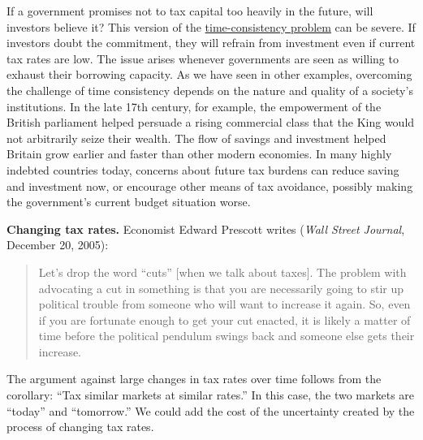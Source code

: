 If a government promises not to tax capital too heavily in the future,
will investors believe it?
This version of the \hyperref[sec:time_cons]{time-consistency problem} can be severe. If investors doubt the commitment, they
will refrain from investment even if current tax rates are low. The issue arises
whenever governments are seen as willing to exhaust their borrowing capacity.
As we have seen in other examples, overcoming the challenge of time
consistency depends on the nature and quality of a society's
institutions. In the late 17th century, for example,
the empowerment of the British parliament helped persuade a
rising commercial class that the King would not arbitrarily
seize their wealth. The flow of savings and investment helped Britain
grow earlier and faster than other modern economies.
In many highly indebted countries today,
concerns about future tax burdens can reduce saving and investment now,
or encourage other means of tax avoidance,
possibly making the government's current budget situation worse.

\begin{comment}
{\it Taxes on labor income.\/}
In our diagram, a tax on labor (collected from either firms or workers)
would discourage work in the same way it discourages other activities
(see Figure \ref{fig:tax}).
The issue here is how sensitive labor supply is to the tax rate.
If people work the same amount whether the tax rate is high or low,
then the social cost is zero.
If they work less when the tax is higher, then the cost is positive.
Generally the flatter the supply curve the higher the cost.
You can show this in the figure, but it takes good draftsmanship.

How sensitive is labor supply?  Somewhat.
The most sensitive components of labor supply
seem to be spouses in two-income households
(does one stay home, or take early retirement?)
and poor people (many of whom would lose
means-tested benefits if they worked).
\end{comment}


\textbf{Changing tax rates. }
Economist Edward Prescott writes
({\it Wall Street Journal\/}, December 20, 2005):
%
\begin{quote}
Let's drop the word ``cuts'' [when we talk about taxes].  The problem with advocating a cut in something is that you are necessarily going to stir up political trouble from someone who will want to increase it again.  So, even if you are fortunate enough to get your cut enacted, it is likely a matter of time before the political pendulum swings back and someone else gets their increase. \end{quote}
%
The argument against large changes in tax rates over time
follows from the corollary:  ``Tax similar markets at similar rates.''
In this case, the two markets are ``today'' and ``tomorrow.''
We could add the cost of the uncertainty created
by the process of changing tax rates.

